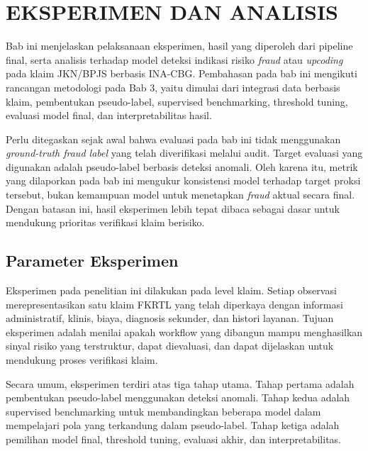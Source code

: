 \chapter{EKSPERIMEN DAN ANALISIS}

Bab ini menjelaskan pelaksanaan eksperimen, hasil yang diperoleh dari pipeline final, serta analisis terhadap model deteksi indikasi risiko \emph{fraud} atau \emph{upcoding} pada klaim JKN/BPJS berbasis INA-CBG. Pembahasan pada bab ini mengikuti rancangan metodologi pada Bab 3, yaitu dimulai dari integrasi data berbasis klaim, pembentukan pseudo-label, supervised benchmarking, threshold tuning, evaluasi model final, dan interpretabilitas hasil.

Perlu ditegaskan sejak awal bahwa evaluasi pada bab ini tidak menggunakan \emph{ground-truth fraud label} yang telah diverifikasi melalui audit. Target evaluasi yang digunakan adalah pseudo-label berbasis deteksi anomali. Oleh karena itu, metrik yang dilaporkan pada bab ini mengukur konsistensi model terhadap target proksi tersebut, bukan kemampuan model untuk menetapkan \emph{fraud} aktual secara final. Dengan batasan ini, hasil eksperimen lebih tepat dibaca sebagai dasar untuk mendukung prioritas verifikasi klaim berisiko.

\section{Parameter Eksperimen}\label{parameter-eksperimen}

Eksperimen pada penelitian ini dilakukan pada level klaim. Setiap observasi merepresentasikan satu klaim FKRTL yang telah diperkaya dengan informasi administratif, klinis, biaya, diagnosis sekunder, dan histori layanan. Tujuan eksperimen adalah menilai apakah workflow yang dibangun mampu menghasilkan sinyal risiko yang terstruktur, dapat dievaluasi, dan dapat dijelaskan untuk mendukung proses verifikasi klaim.

Secara umum, eksperimen terdiri atas tiga tahap utama. Tahap pertama adalah pembentukan pseudo-label menggunakan deteksi anomali. Tahap kedua adalah supervised benchmarking untuk membandingkan beberapa model dalam mempelajari pola yang terkandung dalam pseudo-label. Tahap ketiga adalah pemilihan model final, threshold tuning, evaluasi akhir, dan interpretabilitas.

